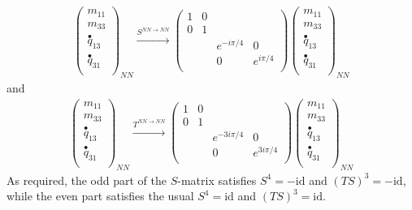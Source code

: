 \begin{align}
\left( \begin{matrix}
m_{11}\\
m_{33}\\
\stackrel{\bullet}{q}_{13}\\
\stackrel{\bullet}{q}_{31}\\
\end{matrix} \right)_{NN}
\xrightarrow{S^{NN \rightarrow NN}}
 \left( \begin{matrix}
1&0&&\\
0&1&&\\
&&e^{-i\pi/4}&0\\
&&0&e^{i \pi /4}\\ 
\end{matrix} \right)
\left( \begin{matrix}
m_{11}\\
m_{33}\\
\stackrel{\bullet}{q}_{13}\\
\stackrel{\bullet}{q}_{31}\\
\end{matrix} \right)_{NN}
\end{align}
and 
\begin{align}
\left( \begin{matrix}
m_{11}\\
m_{33}\\
\stackrel{\bullet}{q}_{13}\\
\stackrel{\bullet}{q}_{31}\\
\end{matrix} \right)_{NN}
\xrightarrow{T^{NN \rightarrow NN}}
 \left( \begin{matrix}
1&0&&\\
0&1&&\\
&&e^{-3i\pi/4}&0\\
&&0&e^{3i \pi /4}\\ 
\end{matrix} \right)
\left( \begin{matrix}
m_{11}\\
m_{33}\\
\stackrel{\bullet}{q}_{13}\\
\stackrel{\bullet}{q}_{31}\\
\end{matrix} \right)_{NN}
\end{align}
As required, the odd part of the $S$-matrix satisfies $S^4 = -\text{id}$ and $(TS)^3 = -\text{id}$, 
while the even part satisfies the usual $S^4 = \text{id}$ and $(TS)^3 = \text{id}$. 

